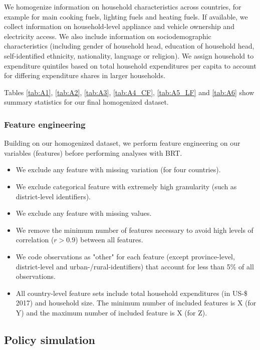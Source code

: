 \documentclass[12pt, a4paper]{article}
\begin{document}
We homogenize information on household characteristics across countries, for example for main cooking fuels, lighting fuels and heating fuels. If available, we collect information on household-level appliance and vehicle ownership and electricity access. We also include information on sociodemographic characteristics (including gender of household head, education of household head, self-identified ethnicity, nationality, language or religion).
We assign household to expenditure quintiles based on total household expenditures per capita to account for differing expenditure shares in larger households. 

Tables \ref{tab:A1}, \ref{tab:A2}, \ref{tab:A3}, \ref{tab:A4_CF}, \ref{tab:A5_LF} and \ref{tab:A6} show summary statistics for our final homogenized dataset. 


\subsubsection{Feature engineering} \label{sec:featureengineering}

Building on our homogenized dataset, we perform feature engineering on our variables (features) before performing analyses with BRT.

\begin{itemize}
    \item We exclude any feature with missing variation (for four countries).
    \item We exclude categorical feature with extremely high granularity (such as district-level identifiers).
    \item We exclude any feature with missing values.
    \item We remove the minimum number of features necessary to avoid high levels of correlation ($r>0.9$) between all features.
    \item We code observations as "other" for each feature (except province-level, district-level and urban-/rural-identifiers) that account for less than 5\% of all observations.
    \item All country-level feature sets include total household expenditures (in US-\$ 2017) and household size. The minimum number of included features is X (for Y) and the maximum number of included feature is X (for Z).
\end{itemize}

\subsection{Policy simulation}\label{sec:policysimulation}
\end{document}
